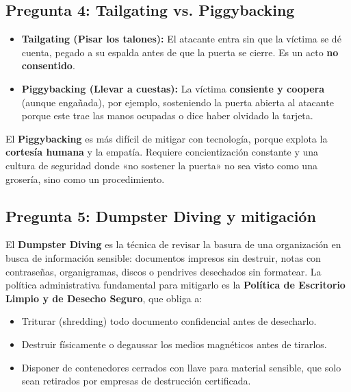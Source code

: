 \documentclass[11pt,a4paper]{article}
\begin{document}
\subsection*{Pregunta 4: Tailgating vs. Piggybacking}
\begin{respuesta}
\begin{itemize}[leftmargin=*]
  \item \textbf{Tailgating (Pisar los talones):} El atacante entra sin que la víctima se dé cuenta, pegado a su espalda antes de que la puerta se cierre. Es un acto \textbf{no consentido}.
  \item \textbf{Piggybacking (Llevar a cuestas):} La víctima \textbf{consiente y coopera} (aunque engañada), por ejemplo, sosteniendo la puerta abierta al atacante porque este trae las manos ocupadas o dice haber olvidado la tarjeta.
\end{itemize}
El \textbf{Piggybacking} es más difícil de mitigar con tecnología, porque explota la \textbf{cortesía humana} y la empatía. Requiere concientización constante y una cultura de seguridad donde «no sostener la puerta» no sea visto como una grosería, sino como un procedimiento.
\end{respuesta}

\subsection*{Pregunta 5: Dumpster Diving y mitigación}
\begin{respuesta}
El \textbf{Dumpster Diving} es la técnica de revisar la basura de una organización en busca de información sensible: documentos impresos sin destruir, notas con contraseñas, organigramas, discos o pendrives desechados sin formatear.
La política administrativa fundamental para mitigarlo es la \textbf{Política de Escritorio Limpio y de Desecho Seguro}, que obliga a:
\begin{itemize}[leftmargin=*]
  \item Triturar (shredding) todo documento confidencial antes de desecharlo.
  \item Destruir físicamente o degaussar los medios magnéticos antes de tirarlos.
  \item Disponer de contenedores cerrados con llave para material sensible, que solo sean retirados por empresas de destrucción certificada.
\end{itemize}
\end{respuesta}

\end{document}
